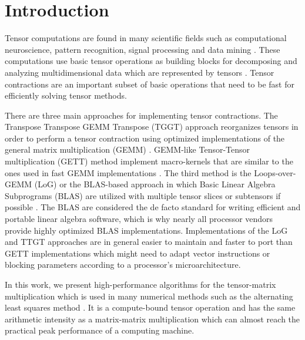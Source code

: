 \section{Introduction}
\label{sec:introduction}
Tensor computations are found in many scientific fields such as computational neuroscience, pattern recognition, signal processing and data mining \citep{karahan:2015:tensor,papalexakis:2017:tensors}.
These computations use basic tensor operations as building blocks for decomposing and analyzing multidimensional data which are represented by tensors \citep{lee:2018:fundamental, kolda:2009:decompositions}. 
Tensor contractions are an important subset of basic operations that need to be fast for efficiently solving tensor methods.

There are three main approaches for implementing tensor contractions.
The Transpose Transpose GEMM Transpose (TGGT) approach reorganizes tensors in order to perform a tensor contraction using optimized implementations of the general matrix multiplication (GEMM) \citep{bader:2006:algorithm862,solomonik:2013:cyclops}.
GEMM-like Tensor-Tensor multiplication (GETT) method implement macro-kernels that are similar to the ones used in fast GEMM implementations \citep{springer:2018:design, matthews:2018:high}.
The third method is the Loops-over-GEMM (LoG) or the BLAS-based approach in which Basic Linear Algebra Subprograms (BLAS) are utilized with multiple tensor slices or subtensors if possible \citep{dinapoli:2014:towards.efficient.use, li:2015:input, shi:2016:tensor.contraction, bassoy:2019:ttv}.
The BLAS are considered the de facto standard for writing efficient and portable linear algebra software, which is why nearly all processor vendors provide highly optimized BLAS implementations.
Implementations of the LoG and TTGT approaches are in general easier to maintain and faster to port than GETT implementations which might need to adapt vector instructions or blocking parameters according to a processor's microarchitecture.


In this work, we present high-performance algorithms for the tensor-matrix multiplication which is used in many numerical methods such as the alternating least squares method \citep{lee:2018:fundamental, kolda:2009:decompositions}.
It is a compute-bound tensor operation and has the same arithmetic intensity as a matrix-matrix multiplication which can almost reach the practical peak performance of a computing machine.

